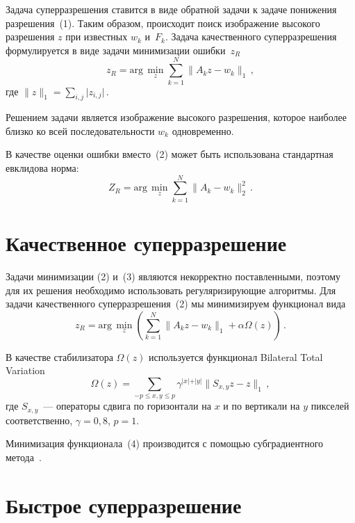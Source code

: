 \begin{multicols}{2}
     Задача суперразрешения ставится в виде обратной задачи к задаче понижения
разрешения~(1). Таким образом, происходит поиск изображение высокого разрешения
$z$ при известных $w_k$ и~$F_k$. Задача качественного суперразрешения
формулируется в виде задачи минимизации ошибки~$z_R$
     \begin{equation}
z_R = \mathrm{arg}\,\underset{z}{\min} \sum\limits_{k=1}^N \parallel A_kz-
w_k\parallel_1\,,
     \label{e2nas}
     \end{equation}
где $\parallel z\parallel_1=\sum\limits_{i,j} \vert z_{i,j}\vert$\,.

     Решением задачи является изображение высокого разрешения, которое наиболее
близко ко всей последовательности $w_k$ одновременно.

     В качестве оценки ошибки вместо~(2) может быть использована стандартная
евклидова норма:
     \begin{equation}
     Z_R =\mathrm{arg}\,\underset{z}{\min}\sum\limits_{k=1}^N\parallel A_k-
w_k\parallel_2^2\,.
     \label{e3nas}
     \end{equation}

     \section{Качественное суперразрешение}

     Задачи минимизации (2) и~(3) являются некорректно поставленными, поэтому
для их решения необходимо использовать регуляризирующие алгоритмы. Для задачи
качественного суперразрешения~(2) мы минимизируем функционал вида
     \begin{equation}
z_R = \mathrm{arg}\,\underset{z}{\min}\left (\sum\limits_{k=1}^N\parallel A_kz-
w_k\parallel_1+\alpha\Omega(z)\right )\,.
     \label{e4nas}
     \end{equation}

     В качестве стабилизатора $\Omega(z)$ используется функционал Bilateral Total
Variation~\cite{13nas}
$$
\Omega(z) = \sum\limits_{-p\leq x,y \leq p} \gamma^{\vert x\vert
+\vert y\vert}\parallel S_{x,y}z-z\parallel_1\,,
$$
где $S_{x,y}$~--- операторы сдвига по
горизонтали на $x$ и по вертикали на $y$ пикселей соответственно, $\gamma = 0{,}8$,
$p=1$.

     Минимизация функционала~(4) производится с помощью субградиентного
метода~\cite{14nas, 15nas}.

     \section{ Быстрое суперразрешение}


\end{multicols}
